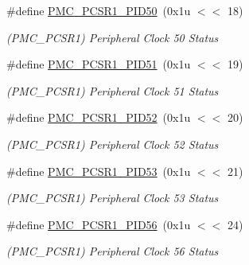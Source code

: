 \begin{DoxyCompactItemize}
\mbox{\label{group__SAME70__PMC_ga30d109c9815bd54cb90dbf6ab4042461}} 
\#define \mbox{\hyperlink{group__SAME70__PMC_ga30d109c9815bd54cb90dbf6ab4042461}{P\+M\+C\+\_\+\+P\+C\+S\+R1\+\_\+\+P\+I\+D50}}~(0x1u $<$$<$ 18)
\begin{DoxyCompactList}\small\item\em (P\+M\+C\+\_\+\+P\+C\+S\+R1) Peripheral Clock 50 Status \end{DoxyCompactList}\item 
\mbox{\label{group__SAME70__PMC_ga7a19ee5cd6015270f035ec3ed95b306d}} 
\#define \mbox{\hyperlink{group__SAME70__PMC_ga7a19ee5cd6015270f035ec3ed95b306d}{P\+M\+C\+\_\+\+P\+C\+S\+R1\+\_\+\+P\+I\+D51}}~(0x1u $<$$<$ 19)
\begin{DoxyCompactList}\small\item\em (P\+M\+C\+\_\+\+P\+C\+S\+R1) Peripheral Clock 51 Status \end{DoxyCompactList}\item 
\mbox{\label{group__SAME70__PMC_ga90e469e8c4092e40cf840c357a234820}} 
\#define \mbox{\hyperlink{group__SAME70__PMC_ga90e469e8c4092e40cf840c357a234820}{P\+M\+C\+\_\+\+P\+C\+S\+R1\+\_\+\+P\+I\+D52}}~(0x1u $<$$<$ 20)
\begin{DoxyCompactList}\small\item\em (P\+M\+C\+\_\+\+P\+C\+S\+R1) Peripheral Clock 52 Status \end{DoxyCompactList}\item 
\mbox{\label{group__SAME70__PMC_ga428a2719b7cbbd3adf3df7ba2758c588}} 
\#define \mbox{\hyperlink{group__SAME70__PMC_ga428a2719b7cbbd3adf3df7ba2758c588}{P\+M\+C\+\_\+\+P\+C\+S\+R1\+\_\+\+P\+I\+D53}}~(0x1u $<$$<$ 21)
\begin{DoxyCompactList}\small\item\em (P\+M\+C\+\_\+\+P\+C\+S\+R1) Peripheral Clock 53 Status \end{DoxyCompactList}\item 
\mbox{\label{group__SAME70__PMC_ga69d2ba5a72f50a7184e1c458c346dfc0}} 
\#define \mbox{\hyperlink{group__SAME70__PMC_ga69d2ba5a72f50a7184e1c458c346dfc0}{P\+M\+C\+\_\+\+P\+C\+S\+R1\+\_\+\+P\+I\+D56}}~(0x1u $<$$<$ 24)
\begin{DoxyCompactList}\small\item\em (P\+M\+C\+\_\+\+P\+C\+S\+R1) Peripheral Clock 56 Status \end{DoxyCompactList}\item 
$$
\end{DoxyCompactItemize}
